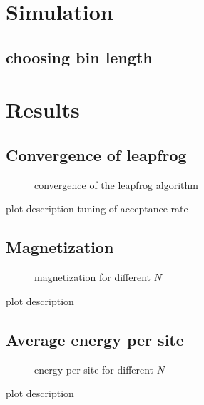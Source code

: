 \documentclass{scrartcl}
\begin{document}
\section{Simulation}

\subsection{choosing bin length}

\section{Results}

\subsection{Convergence of leapfrog}

\begin{figure}[htbp]
	
	\caption{convergence of the leapfrog algorithm}
	\label{fig:converge}
\end{figure}
plot description tuning of acceptance rate
\subsection{Magnetization}
\begin{figure}[htbp]
	
	\caption{magnetization for different $N$}
	\label{fig:magnetization}
\end{figure}
plot description
\subsection{Average energy per site}
\begin{figure}[htbp]
	
	\caption{energy per site for different $N$}
	\label{fig:energy}
\end{figure}
plot description

\newpage	
\listoffigures
\printbibliography
\end{document}
